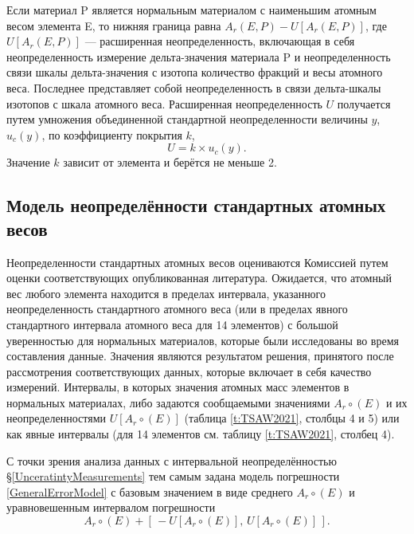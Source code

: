 \documentclass[a5paper,openany]{book}
\begin{document}
Если материал P является нормальным материалом с наименьшим атомным весом элемента E, то нижняя граница равна
$A_r(E, P) - U[A_r(E, P)]$, где $U[A_r(E, P)]$ — расширенная неопределенность, включающая в себя неопределенность
измерение дельта-значения материала P и неопределенность связи шкалы дельта-значения с изотопа
количество фракций и весы атомного веса. Последнее представляет собой неопределенность в связи дельта-шкалы изотопов с
шкала атомного веса.
Расширенная неопределенность $U$ получается путем умножения объединенной стандартной неопределенности величины $y$,
$u_c(y)$, по коэффициенту покрытия $k$,
\begin{equation}
	U = k \times u_c(y).
\end{equation}
Значение $k$ зависит от элемента и берётся не меньше 2.

\subsection{Модель неопределённости стандартных атомных весов}

Неопределенности стандартных атомных весов оцениваются Комиссией путем оценки соответствующих
опубликованная литература. Ожидается, что атомный вес любого элемента находится в пределах интервала, указанного
неопределенность стандартного атомного веса (или в пределах явного стандартного интервала атомного веса для 14
элементов) с большой уверенностью для нормальных материалов, которые были исследованы во время составления
данные. Значения являются результатом решения, принятого после рассмотрения соответствующих данных, которые
включает в себя качество измерений.
Интервалы, в которых значения атомных масс элементов
в нормальных материалах, либо задаются сообщаемыми значениями $A_{r}{\circ}(E)$ и их неопределенностями $U[ A_{r}{\circ}(E)]$
(таблица \ref{t:TSAW2021}, столбцы 4 и 5) или как явные интервалы (для 14 элементов см. таблицу  \ref{t:TSAW2021}, столбец 4).

С точки зрения анализа данных с интервальной неопределённостью \S\ref{UnceratintyMeasurements} тем самым задана модель погрешности 	\eqref{GeneralErrorModel}  с базовым значением в виде среднего $A_{r}{\circ}(E)$ и уравновешенным интервалом погрешности 
\begin{equation*} 
	 A_{r}{\circ}(E) + [ \, -U[ A_{r}{\circ}(E)], \, U[ A_{r}{\circ}(E)] \, ].  
\end{equation*} 
\end{document}
